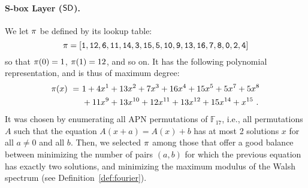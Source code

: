 %



\paragraph{S-box Layer ($\text{\textsf{SD}}$).}
We let $\pi$ be defined by its lookup table:
\begin{equation}
  \label{eq:thesbox}
  \pi = {\tt [1, 12, 6, 11, 14, 3, 15, 5, 10, 9, 13, 16, 7, 8, 0, 2, 4]}
\end{equation}
so that $\pi(0) = 1$, $\pi(1) = 12$, and so on. It has the following polynomial representation, and is thus of maximum degree: %
\begin{equation*}
  \begin{split}
    \pi(x) ~=~& 1 + 4 x^{1} + 13 x^{2} + 7 x^{3} + 16 x^{4} + 15 x^{5} + 5 x^{7} + 5 x^{8} \\
    & + 11 x^{9} + 13 x^{10} + 12 x^{11} + 13 x^{12} + 15 x^{14} + x^{15}~.
  \end{split}
\end{equation*}
It was chosen by enumerating all APN permutations of $\mathbb{F}_{17}$, i.e., all permutations $A$ such that the equation $A(x+a)=A(x)+b$ has at most 2 solutions $x$ for all $a \neq 0$ and all $b$. Then, we selected $\pi$ among those that offer a good balance between minimizing the number of pairs $(a,b)$ for which the previous equation has exactly two solutions, and minimizing the maximum modulus of the Walsh spectrum (see Definition~\ref{def:fourier}).


